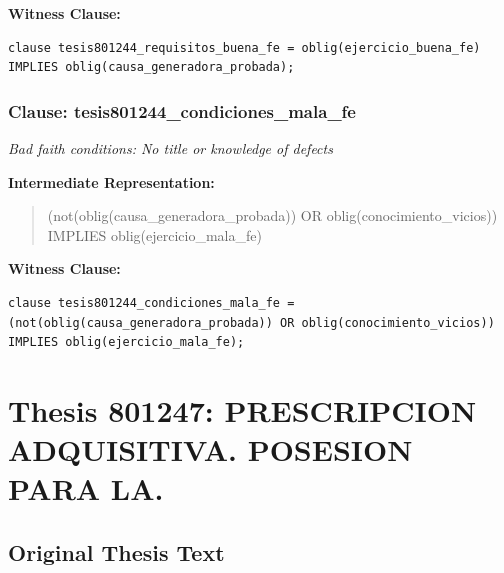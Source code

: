 \documentclass[11pt,a4paper]{article}
\begin{document}
\textbf{Witness Clause:}

\begin{lstlisting}[style=witnessstyle, language=Witness]
clause tesis801244_requisitos_buena_fe = oblig(ejercicio_buena_fe) IMPLIES oblig(causa_generadora_probada);
\end{lstlisting}

\subsubsection{Clause: tesis801244\_condiciones\_mala\_fe}

\textit{Bad faith conditions: No title or knowledge of defects}

\textbf{Intermediate Representation:}

\begin{quote}
(not(oblig(causa\_generadora\_probada)) OR oblig(conocimiento\_vicios)) IMPLIES oblig(ejercicio\_mala\_fe)
\end{quote}

\textbf{Witness Clause:}

\begin{lstlisting}[style=witnessstyle, language=Witness]
clause tesis801244_condiciones_mala_fe = (not(oblig(causa_generadora_probada)) OR oblig(conocimiento_vicios)) IMPLIES oblig(ejercicio_mala_fe);
\end{lstlisting}

\newpage

\section{Thesis 801247: PRESCRIPCION ADQUISITIVA. POSESION PARA LA.}
\label{thesis:801247}

\subsection{Original Thesis Text}
\end{document}
